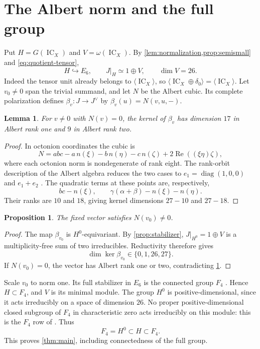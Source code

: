 \documentclass[10pt]{amsart}
\numberwithin{equation}{section}
\newtheorem{proposition}[theorem]{Proposition}
\newtheorem{lemma}[theorem]{Lemma}
\theoremstyle{remark}
\newcommand{\IC}{\operatorname{IC}}
\begin{document}
\section{The Albert norm and the full group}

Put $H=G(\IC_X)$ and $V=\omega(\IC_X)$.  By
\cref{lem:normalization,prop:semismall} and \eqref{eq:quotient-tensor},
\begin{equation}\label{eq:restriction}
 H\hookrightarrow E_6,\qquad J|_H\simeq1\oplus V,\qquad\dim V=26.
\end{equation}
Indeed the tensor unit already belongs to $\langle\IC_X\rangle$, so
$\langle\IC_X\oplus\delta_0\rangle=\langle\IC_X\rangle$.
Let $v_0\ne0$ span the trivial summand, and let $N$ be the Albert cubic.
Its complete polarization defines $\beta_v:J\to J^\vee$ by
$\beta_v(u)=N(v,u,-)$.

\begin{lemma}\label{lem:hessian}
For $v\ne0$ with $N(v)=0$, the kernel of $\beta_v$ has dimension $17$
in Albert rank one and $9$ in Albert rank two.
\end{lemma}
\begin{proof}
In octonion coordinates the cubic is
\[
 N=abc-a\,n(\xi)-b\,n(\eta)-c\,n(\zeta)
       +2\operatorname{Re}((\xi\eta)\zeta),
\]
where each octonion norm is nondegenerate of rank eight.
The rank-orbit description of the Albert algebra reduces the two cases
to $e_1=\operatorname{diag}(1,0,0)$ and $e_1+e_2$
\cite{SpringerVeldkamp2000}.  The quadratic terms at these points are,
respectively,
\[
 bc-n(\xi),\qquad \gamma(\alpha+\beta)-n(\xi)-n(\eta).
\]
Their ranks are $10$ and $18$, giving kernel dimensions $27-10$ and $27-18$.
\end{proof}

\begin{proposition}\label{prop:fixed-norm}
The fixed vector satisfies $N(v_0)\ne0$.
\end{proposition}
\begin{proof}
The map $\beta_{v_0}$ is $H^0$-equivariant.  By
\cref{prop:stabilizer}, $J|_{H^0}=1\oplus V$ is a multiplicity-free sum
of two irreducibles.  Reductivity therefore gives
\[
 \dim\ker\beta_{v_0}\in\{0,1,26,27\}.
\]
If $N(v_0)=0$, the vector has Albert rank one or two, contradicting
\cref{lem:hessian}.
\end{proof}

Scale $v_0$ to norm one.  Its full stabilizer in $E_6$ is the connected
group $F_4$ \cite{SpringerVeldkamp2000}.  Hence $H\subset F_4$, and $V$
is its minimal module.  The group $H^0$ is positive-dimensional, since it
acts irreducibly on a space of dimension $26$.  No proper
positive-dimensional closed subgroup of $F_4$ in characteristic zero acts
irreducibly on this module: this is the $F_4$ row of
\cite[Theorem~1 and Table~1.2]{LiebeckSeitz2004}.  Thus
\[
 F_4=H^0\subset H\subset F_4.
\]
This proves \cref{thm:main}, including connectedness of the full group.
\end{document}
